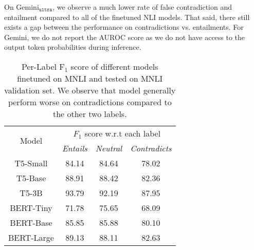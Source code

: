 On Gemini$_{\texttt{ultra}}$, we observe a much lower rate of false contradiction and entailment compared to all of the finetuned NLI models. That said, there still exists a gap between the performance on contradictions vs. entailments. For Gemini, we do not report the AUROC score as we do not have access to the output token probabilities during inference. 


\begin{table}[t]
\small
    \centering
    \begin{tabular}{c|ccc}
    \toprule
    \multirow{ 2}{*}{Model} & \multicolumn{3}{c}{$F_1$ score w.r.t each label}  \\
    & \emph{Entails} & \emph{Neutral} & \emph{Contradicts} \\
    
    \midrule
    T5-Small & 84.14 & 84.64 & 78.02 \\
    T5-Base & 88.91 & 88.42 & 82.36 \\
    T5-3B & 93.79 & 92.19 & 87.95 \\
    BERT-Tiny & 71.78 & 75.65 & 68.09 \\ 
    BERT-Base & 85.85 & 85.88 & 80.10 \\
    BERT-Large & 89.13 & 88.11 & 82.63 \\
     \bottomrule
    \end{tabular}
    \caption{Per-Label F$_1$ score of different models finetuned on MNLI and tested on MNLI validation set. We observe that model generally perform worse on contradictions compared to the other two labels.}
 \label{tab:model-perform-worse}
\end{table}

\begin{table}[t]
    \centering
{}
    \caption{Per-Label precision recall and AUROC of T5-large trained on the mixture of five datasets before $\rightarrow$ after training set filtering described in \cref{ssec:mitigating}}
 \label{tab:mitigating}
\end{table}

